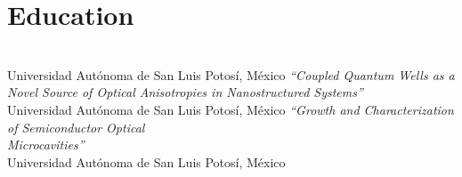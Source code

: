 \documentclass[letterpaper,dvipsnames]{twentysecondcv} %
\begin{document}

\aboutme{} %







\makeprofile %



\section{Education}

\begin{twenty} %

	                       {\\Universidad Aut\'onoma de San Luis Potos\'i, M\'exico}
	                       {\emph{``Coupled Quantum Wells as a Novel Source of Optical Anisotropies in
						   Nanostructured Systems''}}
	                      {\\Universidad Aut\'onoma de San Luis Potos\'i, M\'exico}
	                      {\emph{``Growth and Characterization of Semiconductor Optical \\ Microcavities''}}
	                      {\\Universidad Aut\'onoma de San Luis Potos\'i, M\'exico}
	                      {}
	
\end{twenty}
\end{document}
